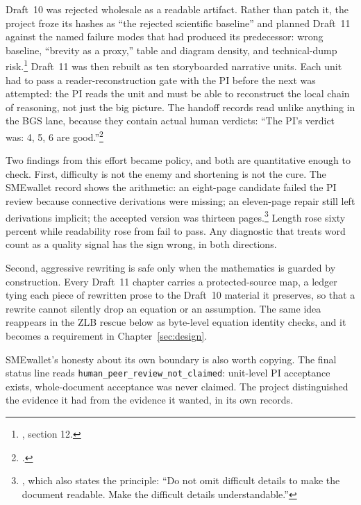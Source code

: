 Draft~10 was rejected wholesale as a readable artifact. Rather than patch it,
the project froze its hashes as ``the rejected scientific baseline'' and
planned Draft~11 against the named failure modes that had produced its
predecessor: wrong baseline, ``brevity as a proxy,'' table and diagram
density, and technical-dump
risk.\footnote{, section 12.}
Draft~11 was then rebuilt as ten storyboarded narrative units. Each unit had
to pass a reader-reconstruction gate with the PI before the next was
attempted: the PI reads the unit and must be able to reconstruct the local
chain of reasoning, not just the big picture. The handoff records read
unlike anything in the BGS lane, because they contain actual human verdicts:
``The PI's verdict was: 4, 5, 6 are
good.''\footnote{.}

Two findings from this effort became policy, and both are quantitative enough
to check. First, difficulty is not the enemy and shortening is not the cure.
The SMEwallet record shows the arithmetic: an eight-page candidate failed the
PI review because connective derivations were missing; an eleven-page repair
still left derivations implicit; the accepted version was thirteen
pages.\footnote{, which also states the principle: ``Do not omit difficult details to make the document readable. Make the difficult details understandable.''}
Length rose sixty percent while readability rose from fail to pass. Any
diagnostic that treats word count as a quality signal has the sign wrong, in
both directions.

Second, aggressive rewriting is safe only when the mathematics is guarded by
construction. Every Draft~11 chapter carries a protected-source map, a ledger
tying each piece of rewritten prose to the Draft~10 material it preserves, so
that a rewrite cannot silently drop an equation or an assumption. The same
idea reappears in the ZLB rescue below as byte-level equation identity checks,
and it becomes a requirement in Chapter~\ref{sec:design}.

SMEwallet's honesty about its own boundary is also worth copying. The final
status line reads
\texttt{human\_peer\_review\_not\_claimed}: unit-level PI acceptance exists,
whole-document acceptance was never claimed. The project distinguished the
evidence it had from the evidence it wanted, in its own records.

